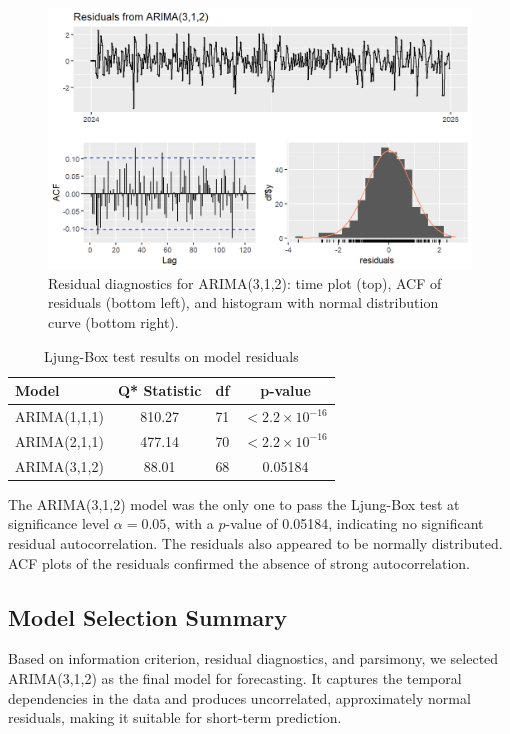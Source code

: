 \documentclass{article}
\begin{document}
\begin{figure}
  \includegraphics[width=\textwidth]{finalproject/images/arima_auto_resid.png}
  \caption{Residual diagnostics for ARIMA(3,1,2): time plot (top), ACF of residuals (bottom left), and histogram with normal distribution curve (bottom right).}
  \label{fig:arima_auto_residuals}
\end{figure}

\begin{table}[h!]
\centering
\caption{Ljung-Box test results on model residuals}
\label{tab:ljungbox}
\begin{tabular}{lccc}
\toprule
\textbf{Model} & \textbf{Q* Statistic} & \textbf{df} & \textbf{p-value} \\
\midrule
ARIMA(1,1,1) & 810.27 & 71 & $< 2.2 \times 10^{-16}$ \\
ARIMA(2,1,1) & 477.14 & 70 & $< 2.2 \times 10^{-16}$ \\
ARIMA(3,1,2) & 88.01 & 68 & 0.05184 \\
\bottomrule
\end{tabular}
\end{table}

The ARIMA(3,1,2) model was the only one to pass the Ljung-Box test at significance level $\alpha=0.05$, with a $p$-value of 0.05184, indicating no significant residual autocorrelation. The residuals also appeared to be normally distributed. ACF plots of the residuals confirmed the absence of strong autocorrelation.

\subsection{Model Selection Summary}

Based on information criterion, residual diagnostics, and parsimony, we selected ARIMA(3,1,2) as the final model for forecasting. It captures the temporal dependencies in the data and produces uncorrelated, approximately normal residuals, making it suitable for short-term prediction.
\end{document}
